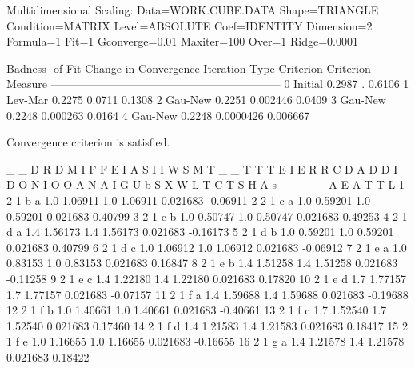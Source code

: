 \documentclass{article}
\begin{document}
\begin{Woutput}
Multidimensional Scaling:  Data=WORK.CUBE.DATA
Shape=TRIANGLE Condition=MATRIX Level=ABSOLUTE
Coef=IDENTITY Dimension=2 Formula=1 Fit=1
 Gconverge=0.01 Maxiter=100 Over=1 Ridge=0.0001

                          Badness-
                            of-Fit    Change in    Convergence
Iteration    Type        Criterion    Criterion        Measure
--------------------------------------------------------------
      0      Initial        0.2987            .         0.6106
      1      Lev-Mar        0.2275       0.0711         0.1308
      2      Gau-New        0.2251     0.002446         0.0409
      3      Gau-New        0.2248     0.000263         0.0164
      4      Gau-New        0.2248    0.0000426       0.006667

Convergence criterion is satisfied.

    _  _                D                                 R
    D  M                I      F      F                   E
    I  A                S      I      I         W         S
    M  T  _  _          T      T      T         E         I
    E  R  R  C   D      A      D      D         I         D
 O  N  I  O  O   A      N      A      I         G         U
 b  S  X  W  L   T      C      T      S         H         A
 s  _  _  _  _   A      E      A      T         T         L
 1  2  1  b  a  1.0  1.06911  1.0  1.06911  0.021683  -0.06911
 2  2  1  c  a  1.0  0.59201  1.0  0.59201  0.021683   0.40799
 3  2  1  c  b  1.0  0.50747  1.0  0.50747  0.021683   0.49253
 4  2  1  d  a  1.4  1.56173  1.4  1.56173  0.021683  -0.16173
 5  2  1  d  b  1.0  0.59201  1.0  0.59201  0.021683   0.40799
 6  2  1  d  c  1.0  1.06912  1.0  1.06912  0.021683  -0.06912
 7  2  1  e  a  1.0  0.83153  1.0  0.83153  0.021683   0.16847
 8  2  1  e  b  1.4  1.51258  1.4  1.51258  0.021683  -0.11258
 9  2  1  e  c  1.4  1.22180  1.4  1.22180  0.021683   0.17820
10  2  1  e  d  1.7  1.77157  1.7  1.77157  0.021683  -0.07157
11  2  1  f  a  1.4  1.59688  1.4  1.59688  0.021683  -0.19688
12  2  1  f  b  1.0  1.40661  1.0  1.40661  0.021683  -0.40661
13  2  1  f  c  1.7  1.52540  1.7  1.52540  0.021683   0.17460
14  2  1  f  d  1.4  1.21583  1.4  1.21583  0.021683   0.18417
15  2  1  f  e  1.0  1.16655  1.0  1.16655  0.021683  -0.16655
16  2  1  g  a  1.4  1.21578  1.4  1.21578  0.021683   0.18422


\end{Woutput}
\end{document}
